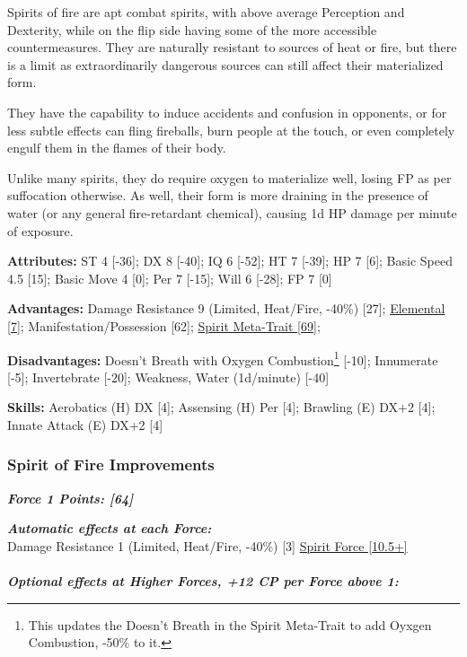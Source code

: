 \begin{multicols*}{3}
	Spirits of fire are apt combat spirits, with above average Perception and Dexterity, while on the flip side having some of the more accessible countermeasures. They are naturally resistant to sources of heat or fire, but there is a limit as extraordinarily dangerous sources can still affect their materialized form.
	
	They have the capability to induce accidents and confusion in opponents, or for less subtle effects can fling fireballs, burn people at the touch, or even completely engulf them in the flames of their body.
	
	Unlike many spirits, they do require oxygen to materialize well, losing FP as per suffocation otherwise. As well, their form is more draining in the presence of water (or any general fire-retardant chemical), causing 1d HP damage per minute of exposure.
	
	\textbf{Attributes:}
	ST 4 [-36]; DX 8 [-40]; IQ 6 [-52]; HT 7 [-39]; HP 7 [6]; Basic Speed 4.5 [15]; Basic Move 4 [0]; Per 7 [-15]; Will 6 [-28]; FP 7 [0]
	
	\textbf{Advantages:}
	Damage Resistance 9 (Limited, Heat/Fire, -40\%) [27]; \hyperref[elemental]{Elemental [7]}; Manifestation/Possession [62]; \hyperref[spirit_meta_trait]{Spirit Meta-Trait [69]};
	
	\textbf{Disadvantages:}
	Doesn't Breath with Oxygen Combustion\footnote{This updates the Doesn't Breath in the Spirit Meta-Trait to add Oyxgen Combustion, -50\% to it.} [-10]; Innumerate [-5]; Invertebrate [-20]; Weakness, Water (1d/minute) [-40]
	
	\textbf{Skills:}
	Aerobatics (H) DX [4]; Assensing (H) Per [4]; Brawling (E) DX+2 [4]; Innate Attack (E) DX+2 [4]
	
	\subsubsection*{Spirit of Fire Improvements}
	
	\textbf{\textit{Force 1 Points: [64]}}
	
	\textbf{\textit{Automatic effects at each Force:\\}}
	Damage Resistance 1 (Limited, Heat/Fire, -40\%) [3]	
	\hyperref[spirit_force]{Spirit Force [10.5+]}\\\\
	
	\textbf{\textit{Optional effects at Higher Forces, +12 CP per Force above 1:\\}}
	

\end{multicols*}

